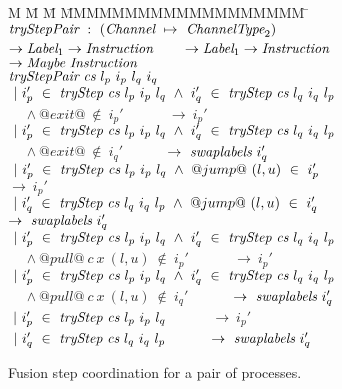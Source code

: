 \begin{figure}
\begin{tabbing}
M \= M \= M \= MMMMMMMMMMMMMMMMMMM \= \kill
$\textit{tryStepPair} ~:~ (\textit{Channel} ~\mapsto~ \textit{ChannelType}_2)$ \\
\> \> $\to \textit{Label}_1 \to \textit{Instruction}$ ~~~
            $\to \textit{Label}_1 \to \textit{Instruction}$ \\
\> \> $\to \textit{Maybe}~\textit{Instruction}$ \\
$\textit{tryStepPair} ~\textit{cs}~l_p~i_p~l_q~i_q$ \\

\> $~|~i_p'~\in~\textit{tryStep}~\textit{cs}~l_p~i_p~l_q ~\wedge~ i_q'~\in~\textit{tryStep}~\textit{cs}~l_q~i_q~l_p$ \\
\> ~~ $\wedge~@exit@~\not\in~i_p'$ 
   ~~~~~ $\to~i_p'$ 
\> \> \>  
\\[0.5ex]

\> $~|~i_p'~\in~\textit{tryStep}~\textit{cs}~l_p~i_p~l_q ~\wedge~i_q'~\in~\textit{tryStep}~\textit{cs}~l_q~i_q~l_p$ \\
\> ~~ $\wedge~@exit@~\not\in~i_q'$ 
   ~~~~~ $\to~\textit{swaplabels}~i_q'$ 
\> \> \>  
\\[0.5ex]


\> $~|~i_p'~\in~\textit{tryStep}~\textit{cs}~l_p~i_p~l_q ~\wedge~@jump@~(l,u)~\in~i_p'$ \\
\> $\to~i_p'$
\> \> \>  
\\[0.5ex]

\> $~|~i_q'~\in~\textit{tryStep}~\textit{cs}~l_q~i_q~l_p ~\wedge~@jump@~(l,u)~\in~i_q'$ \\
\> $\to~\textit{swaplabels}~i_q'$ 
\> \> \> 
\\[0.5ex]

\> $~|~i_p'~\in~\textit{tryStep}~\textit{cs}~l_p~i_p~l_q ~\wedge~ i_q'~\in~\textit{tryStep}~\textit{cs}~l_q~i_q~l_p$ \\
\> ~~ $\wedge~@pull@~c~x~(l,u)~\not\in~i_p'$ 
   ~~~~~ $\to~i_p'$ 
\> \> \>  
\\[0.5ex]

\> $~|~i_p'~\in~\textit{tryStep}~\textit{cs}~l_p~i_p~l_q ~\wedge~i_q'~\in~\textit{tryStep}~\textit{cs}~l_q~i_q~l_p$ \\
\> ~~ $\wedge~@pull@~c~x~(l,u)~\not\in~i_q'$ 
   ~~~~~ $\to~\textit{swaplabels}~i_q'$ 
\> \> \>  
\\[0.5ex]

\> $~|~i_p'~\in~\textit{tryStep}~\textit{cs}~l_p~i_p~l_q$ ~~~~~ $\to~i_p'$ 
\> \> \>  
\\[0.5ex]

\> $~|~i_q'~\in~\textit{tryStep}~\textit{cs}~l_q~i_q~l_p$ ~~~~~ $\to~\textit{swaplabels}~i_q'$
\> \> \>  \\


\end{tabbing}
\caption{Fusion step coordination for a pair of processes.}
\label{fig:Finite:tryStepPair}
\end{figure}

